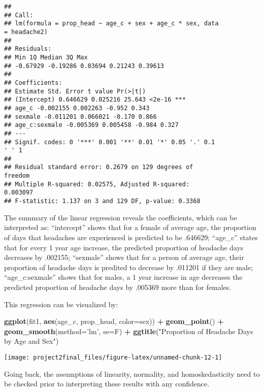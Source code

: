\documentclass[]{article}
\newenvironment{Shaded}{\begin{snugshade}}{\end{snugshade}}
\newcommand{\DataTypeTok}[1]{\textcolor[rgb]{0.13,0.29,0.53}{#1}}
\newcommand{\KeywordTok}[1]{\textcolor[rgb]{0.13,0.29,0.53}{\textbf{#1}}}
\newcommand{\NormalTok}[1]{#1}
\newcommand{\OperatorTok}[1]{\textcolor[rgb]{0.81,0.36,0.00}{\textbf{#1}}}
\newcommand{\StringTok}[1]{\textcolor[rgb]{0.31,0.60,0.02}{#1}}
\begin{document}
\begin{verbatim}
##
## Call:
## lm(formula = prop_head ~ age_c + sex + age_c * sex, data
= headache2)
##
## Residuals:
## Min 1Q Median 3Q Max
## -0.67929 -0.19286 0.03694 0.21243 0.39613
##
## Coefficients:
## Estimate Std. Error t value Pr(>|t|)
## (Intercept) 0.646629 0.025216 25.643 <2e-16 ***
## age_c -0.002155 0.002263 -0.952 0.343
## sexmale -0.011201 0.066021 -0.170 0.866
## age_c:sexmale -0.005369 0.005458 -0.984 0.327
## ---
## Signif. codes: 0 '***' 0.001 '**' 0.01 '*' 0.05 '.' 0.1
' ' 1
##
## Residual standard error: 0.2679 on 129 degrees of
freedom
## Multiple R-squared: 0.02575, Adjusted R-squared:
0.003097
## F-statistic: 1.137 on 3 and 129 DF, p-value: 0.3368
\end{verbatim}

The summary of the linear regression reveals the coefficients, which can
be interpreted as: ``intercept'' shows that for a female of average age,
the proportion of days that headaches are experienced is predicted to be
.646629; ``age\_c'' states that for every 1 year age increase, the
predicted proportion of headache days decreases by .002155; ``sexmale''
shows that for a person of average age, their proportion of headache
days is predited to decrease by .011201 if they are male;
``age\_c:sexmale'' shows that for males, a 1 year increase in age
decreases the predicted proportion of headache days by .005369 more than
for females.

This regression can be visualized by:

\begin{Shaded}
\begin{Highlighting}[]
\KeywordTok{ggplot}\NormalTok{(fit1, }\KeywordTok{aes}\NormalTok{(age_c, prop_head, }\DataTypeTok{color=}\NormalTok{sex)) }\OperatorTok{+}\StringTok{ }\KeywordTok{geom_point}\NormalTok{() }\OperatorTok{+}\StringTok{ }
\StringTok{  }\KeywordTok{geom_smooth}\NormalTok{(}\DataTypeTok{method=}\StringTok{'lm'}\NormalTok{, }\DataTypeTok{se=}\NormalTok{F) }\OperatorTok{+}\StringTok{ }
\StringTok{  }\KeywordTok{ggtitle}\NormalTok{(}\StringTok{"Proportion of Headache Days by Age and Sex"}\NormalTok{)}
\end{Highlighting}
\end{Shaded}

\begin{center}\texttt{[image: project2final\_files/figure-latex/unnamed-chunk-12-1]} \end{center}

Going back, the assumptions of linearity, normality, and
homoskedasticity need to be checked prior to interpreting these results
with any confidence.
\end{document}
